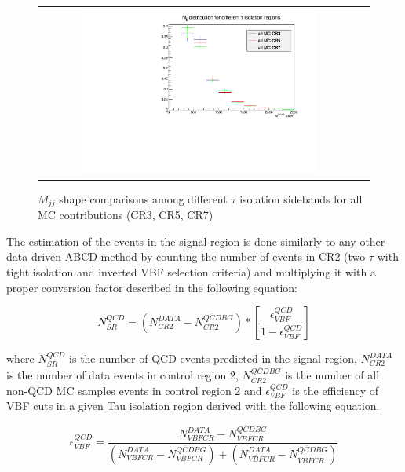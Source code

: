 \begin{figure}[tbh!]
	\centering
	\begin{tabular}{cc}
		\includegraphics[width=0.75\textwidth]{PLOTS/diTauHadLSotherPlots/LS_mjjshapestab_vs_tauiso_mc.pdf}
	\end{tabular}
	\caption{$M_{jj}$ shape comparisons among different $\tau$ isolation sidebands for all MC contributions (CR3, CR5, CR7)}
	\label{fig:LS_mjjshapestab_vs_tauiso_mc}
\end{figure}

The estimation of the events in the signal region is done similarly to any other data driven ABCD method by counting the number of events in CR2 (two $\tau$ with tight isolation and inverted VBF selection criteria) and multiplying it with a proper conversion factor described in the following equation:

\begin{equation}
N^{QCD}_{SR} = \left( N^{DATA}_{CR2} - N^{\overline{QCD} BG}_{CR2} \right) * \left[ \frac{\epsilon^{QCD}_{VBF}}{1 - \epsilon^{QCD}_{VBF}} \right]
\label{eq:qcdbgpred}
\end{equation}

where $N^{QCD}_{SR}$ is the number of QCD events predicted in the signal region, $N^{DATA}_{CR2}$ is the number of data events in control region 2, $N^{\overline{QCD} BG}_{CR2}$ is the number of all non-QCD MC samples events in control region 2 and $\epsilon^{QCD}_{VBF}$ is the efficiency of VBF cuts in a given Tau isolation region derived with the following equation.

\begin{equation}
\epsilon^{QCD}_{VBF} = \frac {N^{DATA}_{VBF CR} - N^{\overline{QCD} BG}_{VBFCR}}{\left( N^{DATA}_{VBFCR} - N^{\overline{QCD} BG}_{VBFCR} \right) + \left( N^{DATA}_{\overline{VBF}CR} - N^{\overline{QCD} BG}_{\overline{VBF}CR} \right) }
\label{eq:vbfeff}
\end{equation}

